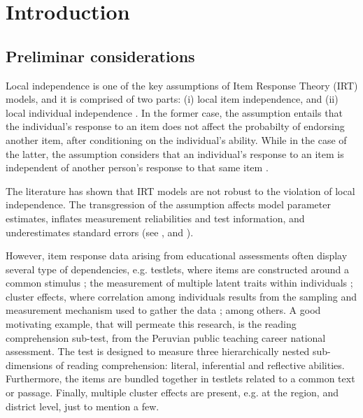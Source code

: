 \chapter{Introduction}

\section{Preliminar considerations}

Local independence is one of the key assumptions of Item Response Theory (IRT) models, and it is comprised of two parts: (i) local item independence, and (ii) local individual independence \cite{Baker_2001, Hambleton_et_al_1991a}. In the former case, the assumption entails that the individual's response to an item does not affect the probabilty of endorsing another item, after conditioning on the individual's ability. While in the case of the latter, the assumption considers that an individual's response to an item is independent of another person's response to that same item \cite{Reckase_2009}. 

The literature has shown that IRT models are not robust to the violation of local independence. The transgression of the assumption affects model parameter estimates, inflates measurement reliabilities and test information, and underestimates standard errors (see \citet{Yen_1984, Chen_et_al_1997}, and  \citet{Jiao_et_al_2012}). 

However, item response data arising from educational assessments often display several type of dependencies, e.g. testlets, where items are constructed around a common stimulus \cite{Wainer_et_al_2007}; the measurement of multiple latent traits within individuals \cite{Reckase_2009}; cluster effects, where correlation among individuals results from the sampling and measurement mechanism used to gather the data \cite{Raudenbush_et_al_2002}; among others. A good motivating example, that will permeate this research, is the reading comprehension sub-test, from the Peruvian public teaching career national assessment. The test is designed to measure three hierarchically nested sub-dimensions of reading comprehension: literal, inferential and reflective abilities. Furthermore, the items are bundled together in testlets related to a common text or passage. Finally, multiple cluster effects are present, e.g. at the region, and district level, just to mention a few.

